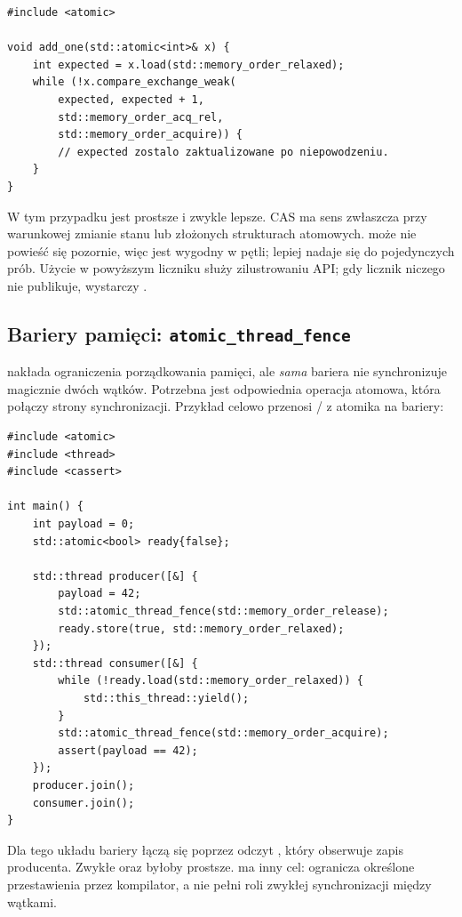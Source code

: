 \begin{lstlisting}[caption={Pętla CAS: zwiększanie licznika, przykład praktyczny.}]
#include <atomic>

void add_one(std::atomic<int>& x) {
    int expected = x.load(std::memory_order_relaxed);
    while (!x.compare_exchange_weak(
        expected, expected + 1,
        std::memory_order_acq_rel,
        std::memory_order_acquire)) {
        // expected zostalo zaktualizowane po niepowodzeniu.
    }
}
\end{lstlisting}

W tym przypadku  jest prostsze i zwykle lepsze.
CAS ma sens zwłaszcza przy warunkowej zmianie stanu lub złożonych
strukturach atomowych.  może nie powieść się pozornie,
więc jest wygodny w pętli;  lepiej nadaje się do
pojedynczych prób. Użycie  w powyższym liczniku służy
zilustrowaniu API; gdy licznik niczego nie publikuje, wystarczy
.

\subsection{Bariery pamięci: \texttt{atomic\_thread\_fence}}

 nakłada ograniczenia porządkowania
pamięci, ale \emph{sama} bariera nie synchronizuje magicznie dwóch wątków.
Potrzebna jest odpowiednia operacja atomowa, która połączy strony
synchronizacji. Przykład celowo przenosi /
z atomika na bariery:

\begin{lstlisting}[caption={Publikacja przez dwie bariery i atomowy znacznik (C++11).}]
#include <atomic>
#include <thread>
#include <cassert>

int main() {
    int payload = 0;
    std::atomic<bool> ready{false};

    std::thread producer([&] {
        payload = 42;
        std::atomic_thread_fence(std::memory_order_release);
        ready.store(true, std::memory_order_relaxed);
    });
    std::thread consumer([&] {
        while (!ready.load(std::memory_order_relaxed)) {
            std::this_thread::yield();
        }
        std::atomic_thread_fence(std::memory_order_acquire);
        assert(payload == 42);
    });
    producer.join();
    consumer.join();
}
\end{lstlisting}

Dla tego układu bariery łączą się poprzez odczyt , który
obserwuje zapis producenta. Zwykłe  oraz
 byłoby prostsze. 
ma inny cel: ogranicza określone przestawienia przez kompilator,
a nie pełni roli zwykłej synchronizacji między wątkami.

